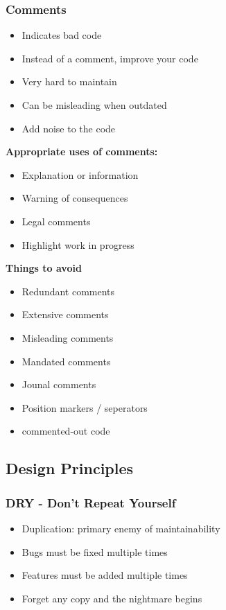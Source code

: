 \subsubsection{Comments}
\begin{itemize}
    \item Indicates bad code
    \item Instead of a comment, improve your code
    \item Very hard to maintain
    \item Can be misleading when outdated
    \item Add noise to the code
\end{itemize}
\textbf{Appropriate uses of comments:}
\begin{itemize}
    \item Explanation or information
    \item Warning of consequences
    \item Legal comments
    \item Highlight work in progress
\end{itemize}
\textbf{Things to avoid}
\begin{itemize}
    \item Redundant comments
    \item Extensive comments
    \item Misleading comments
    \item Mandated comments
    \item Jounal comments
    \item Position markers / seperators
    \item commented-out code
\end{itemize}

\subsection{Design Principles}
\subsubsection{DRY - Don't Repeat Yourself}
\begin{itemize}
    \item Duplication: primary enemy of maintainability
    \item Bugs must be fixed multiple times
    \item Features must be added multiple times
    \item Forget any copy and the nightmare begins
\end{itemize}

